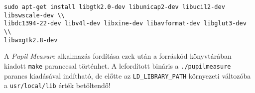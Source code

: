\begin{lstlisting}[frame=single,float=!ht,caption=Az OpenCV fordításához szükséges csomagok telepítése,label=listing:install]
sudo apt-get install libgtk2.0-dev libunicap2-dev libucil2-dev libswscale-dev \\
libdc1394-22-dev libv4l-dev libxine-dev libavformat-dev libglut3-dev \\
libwxgtk2.8-dev
\end{lstlisting}

A \emph{Pupil Measure} alkalmazás fordítása ezek után a forráskód könyvtárában kiadott \texttt{make} paranccsal történhet. A lefordított bináris a \texttt{./pupilmeasure} parancs kiadásával indítható, de előtte az \texttt{LD\_LIBRARY\_PATH} környezeti változóba a \texttt{usr/local/lib} érték betöltendő!

